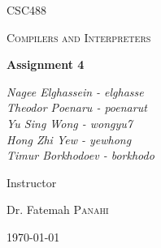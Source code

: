 \documentclass[12pt]{article}
\begin{document}
\begin{titlepage}
	\centering
	{\scshape\LARGE CSC488 \par}
	\vspace{1cm}
	{\scshape\Large Compilers and Interpreters \par}
	\vspace{1.5cm}
	{\huge\bfseries Assignment 4 \par}
	\vspace{2cm}
	{\Large\itshape
  Nagee Elghassein -   elghasse \\ 
Theodor Poenaru    - poenarut   \\ 
Yu Sing Wong       - wongyu7    \\ 
Hong Zhi Yew       - yewhong    \\ 
Timur Borkhodoev   - borkhodo    
  \par}
	\vfill
	Instructor\par
	Dr. Fatemah \textsc{Panahi}

	\vfill

	{\large \today\par}
\end{titlepage}
\tableofcontents
\newpage






\end{document}
